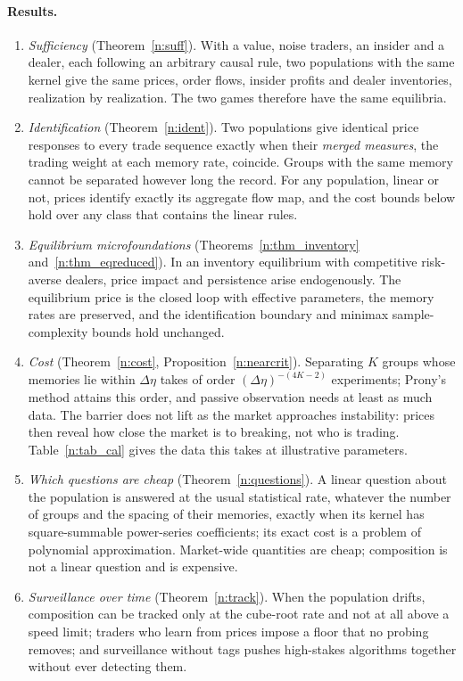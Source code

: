 \documentclass[12pt]{article}
\theoremstyle{definition}
\theoremstyle{remark}
\begin{document}
\paragraph{Results.}
\begin{enumerate}[label=(\arabic*),leftmargin=*,itemsep=2pt]
\item \emph{Sufficiency} (Theorem~\ref{n:suff}). With a value, noise traders, an insider and a dealer, each following an arbitrary causal rule, two populations with the same kernel give the same prices, order flows, insider profits and dealer inventories, realization by realization. The two games therefore have the same equilibria.
\item \emph{Identification} (Theorem~\ref{n:ident}). Two populations give identical price responses to every trade sequence exactly when their \emph{merged measures}, the trading weight at each memory rate, coincide. Groups with the same memory cannot be separated however long the record. For any population, linear or not, prices identify exactly its aggregate flow map, and the cost bounds below hold over any class that contains the linear rules.
\item \emph{Equilibrium microfoundations} (Theorems~\ref{n:thm_inventory} and~\ref{n:thm_eqreduced}). In an inventory equilibrium with competitive risk-averse dealers, price impact and persistence arise endogenously. The equilibrium price is the closed loop with effective parameters, the memory rates are preserved, and the identification boundary and minimax sample-complexity bounds hold unchanged.
\item \emph{Cost} (Theorem~\ref{n:cost}, Proposition~\ref{n:nearcrit}). Separating $K$ groups whose memories lie within $\Delta\eta$ takes of order $(\Delta\eta)^{-(4K-2)}$ experiments; Prony's method attains this order, and passive observation needs at least as much data. The barrier does not lift as the market approaches instability: prices then reveal how close the market is to breaking, not who is trading. Table~\ref{n:tab_cal} gives the data this takes at illustrative parameters.
\item \emph{Which questions are cheap} (Theorem~\ref{n:questions}). A linear question about the population is answered at the usual statistical rate, whatever the number of groups and the spacing of their memories, exactly when its kernel has square-summable power-series coefficients; its exact cost is a problem of polynomial approximation. Market-wide quantities are cheap; composition is not a linear question and is expensive.
\item \emph{Surveillance over time} (Theorem~\ref{n:track}). When the population drifts, composition can be tracked only at the cube-root rate and not at all above a speed limit; traders who learn from prices impose a floor that no probing removes; and surveillance without tags pushes high-stakes algorithms together without ever detecting them.

\end{enumerate}
\end{document}
